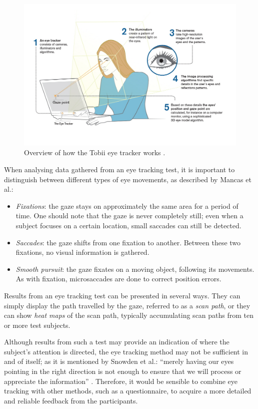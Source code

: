 \begin{figure}[h!]
	\centering
	\includegraphics[width=\textwidth]{figures/tobii.jpg}
	\caption{Overview of how the Tobii eye tracker works \cite{TobiiPro}.\label{fig:tobii}}
\end{figure}

When analysing data gathered from an eye tracking test, it is important to distinguish between different types of eye movements, as described by Mancas et al.:

\begin{itemize}
\item \textit{Fixations}: the gaze stays on approximately the same area for a period of time. One should note that the gaze is never completely still; even when a subject focuses on a certain location, small saccades can still be detected.
\item \textit{Saccades}: the gaze shifts from one fixation to another. Between these two fixations, no visual information is gathered.
\item \textit{Smooth pursuit}: the gaze fixates on a moving object, following its movements. As with fixation, microsaccades are done to correct position errors.
\end{itemize}

Results from an eye tracking test can be presented in several ways. They can simply display the path travelled by the gaze, referred to as a \textit{scan path}, or they can show \textit{heat maps} of the scan path, typically accumulating scan paths from ten or more test subjects. 

Although results from such a test may provide an indication of where the subject’s attention is directed, the eye tracking method may not be sufficient in and of itself; as it is mentioned by Snowden et al.: “merely having our eyes pointing in the right direction is not enough to ensure that we will process or appreciate the information” \cite{snowden2012basic}. Therefore, it would be sensible to combine eye tracking with other methods, such as a questionnaire, to acquire a more detailed and reliable feedback from the participants.

